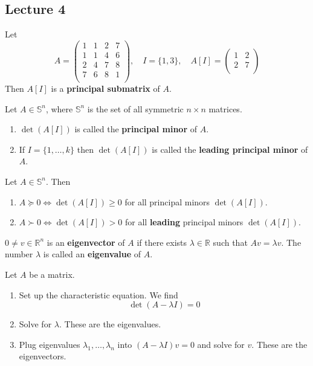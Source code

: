\subsection{Lecture 4}

\begin{definition}
  Let $$A = \begin{pmatrix}
    1 & 1 & 2 & 7 \\
    1 & 1 & 4 & 6 \\
    2 & 4 & 7 & 8 \\
    7 & 6 & 8 & 1 \\
  \end{pmatrix}, \quad I = \{1,3\}, \quad A[I] = \begin{pmatrix}
    1 & 2 \\
    2 & 7 \\
  \end{pmatrix}$$
  Then $A[I]$ is a \textbf{principal submatrix} of $A$.
\end{definition}
\begin{definition}
  Let $A \in \mathbb S^n$, where $\mathbb S^n$ is the set of all symmetric $n \times n$ matrices.
\begin{enumerate}
  \item $\det(A[I])$ is called the \textbf{principal minor} of $A$.
  \item If $I = \{1,\ldots, k\}$ then $\det(A[I])$ is called the \textbf{leading principal minor} of $A$.
\end{enumerate}
\end{definition}
\begin{proposition}
  Let $A \in \mathbb S^n$. Then
  \begin{enumerate}
    \item $A \succeq 0 \iff \det(A[I]) \geq 0$ for all principal minors $\det(A[I])$.
    \item $A \succ 0 \iff \det(A[I]) > 0$ for all \textbf{leading} principal minors $\det(A[I])$.
  \end{enumerate}
\end{proposition}
\begin{definition}
  $0 \neq v \in \mathbb R^n$ is an \textbf{eigenvector} of $A$ if there exists $\lambda \in \mathbb R$ such that $Av = \lambda v$. The number $\lambda$ is called an \textbf{eigenvalue} of $A$.
\end{definition}
\begin{theorem}
  Let $A$ be a matrix.
  \begin{enumerate}
    \item Set up the characteristic equation. We find $$\det(A - \lambda I) = 0$$
    \item Solve for $\lambda$. These are the eigenvalues.
    \item Plug eigenvalues $\lambda_1,\ldots, \lambda_n$ into $(A - \lambda I)v = 0$ and solve for $v$. These are the eigenvectors.
  \end{enumerate}
\end{theorem}
